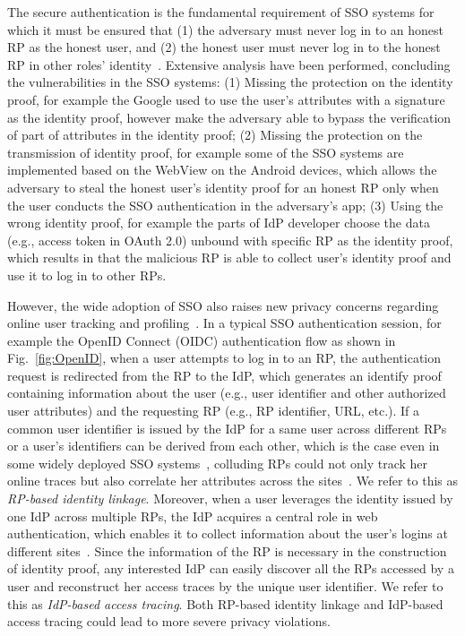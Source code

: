 The secure authentication is the fundamental requirement of SSO systems for which it must be ensured that (1) the adversary must never log in to an honest RP as the honest user, and (2) the honest user must never log in to the honest RP in other roles' identity~\cite{SPRESSO}. Extensive analysis have been performed, concluding the vulnerabilities in the SSO systems: (1) Missing the protection on the identity proof, for example the Google used to use the user's attributes with a signature as the identity proof, however make the adversary able to bypass the verification of part of attributes in the identity proof; (2) Missing the protection on the transmission of identity proof, for example some of the SSO systems are implemented based on the WebView on the Android devices, which allows the adversary to steal the honest user's identity proof for an honest RP only when the user conducts the SSO authentication in the adversary's app; 
(3) Using the wrong identity proof, for example the parts of IdP developer choose the data (e.g., access token in OAuth 2.0) unbound with specific RP as the identity proof, which results in that the malicious RP is able to collect user's identity proof and use it to log in to other RPs. 

However, the wide adoption of SSO also raises new privacy concerns regarding online user tracking and profiling~\cite{maler2008venn,NIST2017draft}. In a typical SSO authentication session, for example the OpenID Connect (OIDC) authentication flow as shown in Fig.~\ref{fig:OpenID}, when a user attempts to log in to an RP, the authentication request is redirected from the RP to the IdP, which generates an identify proof containing information about the user (e.g., user identifier and other authorized user attributes) and the requesting RP (e.g., RP identifier, URL, etc.). If a common user identifier is issued by the IdP for a same user across different RPs or a user's identifiers can be derived from each other, which is the case even in some widely deployed SSO systems~\cite{BrowserID,SPRESSO}, colluding RPs could not only track her online traces but also correlate her attributes across the sites~\cite{maler2008venn}. We refer to this as {\em RP-based identity linkage}. Moreover, when a user leverages the identity issued by one IdP across multiple RPs, the IdP acquires a central role in web authentication, which enables it to collect information about the user's logins at different sites~\cite{maler2008venn}. Since the information of the RP is necessary in the construction of identity proof, any interested IdP can easily discover all the RPs accessed by a user and reconstruct her access traces by the unique user identifier. We refer to this as {\em IdP-based access tracing}. Both RP-based identity linkage and IdP-based access tracing could lead to more severe privacy violations.

